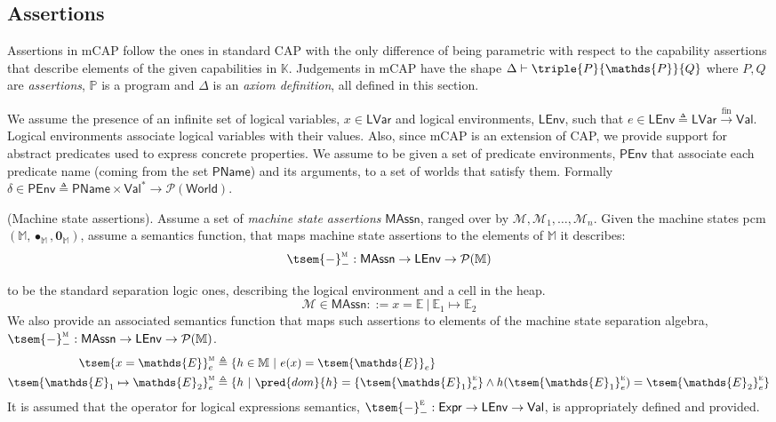 \subsection{Assertions}

Assertions in mCAP follow the ones in standard CAP with the only difference of being parametric with respect to the capability assertions that describe elements of the given capabilities in $\mathbb{K}$. Judgements in mCAP have the shape $\Delta \vdash \triple{P}{\mathds{P}}{Q}$ where $P, Q$ are \textit{assertions}, $\mathds{P}$ is a program and $\Delta$ is an \textit{axiom definition}, all defined in this section.

We assume the presence of an infinite set of logical variables, $x \in \mathsf{LVar}$ and logical environments, $\mathsf{LEnv}$, such that $e \in \mathsf{LEnv} \triangleq \mathsf{LVar} \xrightarrow{\text{fin}} \mathsf{Val}$. Logical environments associate logical variables with their values. Also, since mCAP is an extension of CAP, we provide support for abstract predicates used to express concrete properties. We assume to be given a set of predicate environments, $\mathsf{PEnv}$ that associate each predicate name (coming from the set $\mathsf{PName}$) and its arguments, to a set of worlds that satisfy them. Formally $\delta \in \mathsf{PEnv} \triangleq \mathsf{PName} \times \mathsf{Val}^* \rightarrow \mathcal{P}(\mathsf{World})$.

\begin{param}
	(Machine state assertions).
	Assume a set of \emph{machine state assertions} $\mathsf{MAssn}$, ranged over by $\mathcal{M}, \mathcal{M}_1, \ldots, \mathcal{M}_n$. Given the machine states pcm $(\mathbb{M}, \bullet_\mathbb{M}, \mathbf{0}_\mathbb{M})$, assume a semantics function, that maps machine state assertions to the elements of $\mathbb{M}$ it describes:
	\[
		\tsem{-}_-^\textsc{m} : \mathsf{MAssn} \rightarrow \mathsf{LEnv} \rightarrow \mathcal{P}(\mathbb{M})
	\]
\end{param}

 to be the standard separation logic ones, describing the logical environment and a cell in the heap.
	\[
		\mathcal{M} \in \mathsf{MAssn} ::= x = \mathds{E}\ |\ \mathds{E}_1 \mapsto \mathds{E}_2
	\]
	We also provide an associated semantics function that maps such assertions to elements of the machine state separation algebra, $\tsem{-}_-^\textsc{m} : \mathsf{MAssn} \rightarrow \mathsf{LEnv} \rightarrow \mathcal{P}(\mathbb{M})$.
	\begin{align*}
		\tsem{x = \mathds{E}}^\textsc{m}_e &\triangleq \{ h \in \mathbb{M}\ |\ e(x) = \tsem{\mathds{E}}_e \}
		\\
		\tsem{\mathds{E}_1 \mapsto \mathds{E}_2}_e^\textsc{m} &\triangleq \{ h\ |\ \pred{dom}{h} = \{\tsem{\mathds{E}_1}_e^\textsc{e}\} \land h(\tsem{\mathds{E}_1}_e^\textsc{e}) = \tsem{\mathds{E}_2}_e^\textsc{e} \}
	\end{align*}
	It is assumed that the operator for logical expressions semantics, $\tsem{-}_-^\textsc{e} : \mathsf{Expr} \rightarrow \mathsf{LEnv} \rightarrow \mathsf{Val}$, is appropriately defined and provided.

